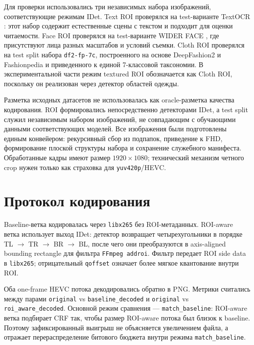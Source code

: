 \documentclass[12pt,a4paper,oneside,openany]{report}
\begin{document}
Для проверки использовались три независимых набора изображений, соответствующие режимам IDet.
Text ROI проверялся на test-варианте TextOCR \cite{textocr}: этот набор содержит естественные
сцены с текстом и подходит для оценки читаемости. Face ROI проверялся на test-варианте WIDER
FACE \cite{widerface}, где присутствуют лица разных масштабов и условий съемки. Cloth ROI
проверялся на test split набора \texttt{df2-fp-7c}, построенного на основе DeepFashion2 и
Fashionpedia и приведенного к единой 7-классовой таксономии. В экспериментальной части режим
textured ROI обозначается как Cloth ROI, поскольку он реализован через детектор областей одежды.

Разметка исходных датасетов не использовалась как oracle-разметка качества кодирования. ROI
формировались непосредственно детекторами IDet, а test split служил независимым набором
изображений, не совпадающим с обучающими данными соответствующих моделей. Все изображения были
подготовлены единым конвейером: рекурсивный сбор из подпапок, приведение к FHD, формирование
плоской структуры набора и сохранение служебного манифеста. Обработанные кадры имеют размер
$1920\times1080$; технический механизм четного crop нужен только как страховка для
\texttt{yuv420p}/HEVC.


\section{Протокол кодирования}

Baseline-ветка кодировалась через \texttt{libx265} без ROI-метаданных. ROI-aware ветка использует
выход IDet: детектор возвращает четырехугольники в порядке TL $\rightarrow$ TR $\rightarrow$ BR
$\rightarrow$ BL, после чего они преобразуются в axis-aligned bounding rectangle для фильтра
\texttt{FFmpeg addroi}. Фильтр передает ROI side data в \texttt{libx265}; отрицательный
\texttt{qoffset} означает более мягкое квантование внутри ROI.

Оба one-frame HEVC потока декодировались обратно в PNG. Метрики считались между парами
\texttt{original} vs \texttt{baseline\_decoded} и \texttt{original} vs
\texttt{roi\_aware\_decoded}. Основной режим сравнения --- \texttt{match\_baseline}:
ROI-aware ветка подбирает CRF так, чтобы размер ROI-aware потока был близок к baseline. Поэтому
зафиксированный выигрыш не объясняется увеличением файла, а отражает перераспределение битового
бюджета внутри режима \texttt{match\_baseline}.
\end{document}
